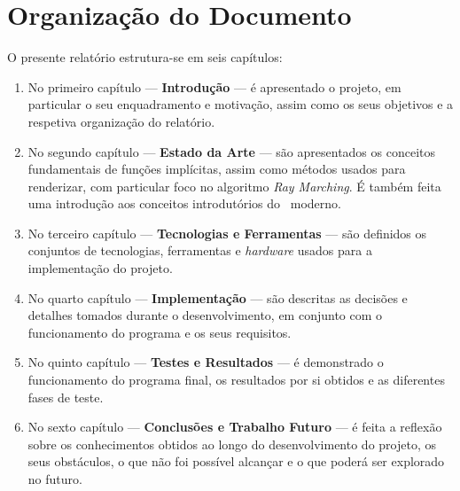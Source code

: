 \section{Organização do Documento}
\label{sec::intro:orgdoc}

O presente relatório estrutura-se em seis capítulos:

\begin{enumerate}
	\item No primeiro capítulo --- \textbf{Introdução} --- é apresentado o projeto, em particular o seu enquadramento e motivação, assim como os seus objetivos e a respetiva organização do relatório.
	
	\item No segundo capítulo --- \textbf{Estado da Arte} --- são apresentados os conceitos fundamentais de funções implícitas, assim como métodos usados para renderizar, com particular foco no algoritmo \textit{Ray Marching}. É também feita uma introdução aos conceitos introdutórios do \opengl~moderno.
	
	\item No terceiro capítulo --- \textbf{Tecnologias e Ferramentas} --- são definidos os conjuntos de tecnologias, ferramentas e \textit{hardware} usados para a implementação do projeto.
	
	\item No quarto capítulo --- \textbf{Implementação} --- são descritas as decisões e detalhes tomados durante o desenvolvimento, em conjunto com o funcionamento do programa e os seus requisitos.
	
	\item No quinto capítulo --- \textbf{Testes e Resultados} --- é demonstrado o funcionamento do programa final, os resultados por si obtidos e as diferentes fases de teste.
	
	\item No sexto capítulo --- \textbf{Conclusões e Trabalho Futuro} --- é feita a reflexão sobre os conhecimentos obtidos ao longo do desenvolvimento do projeto, os seus obstáculos, o que não foi possível alcançar e o que poderá ser explorado no futuro.
\end{enumerate}
